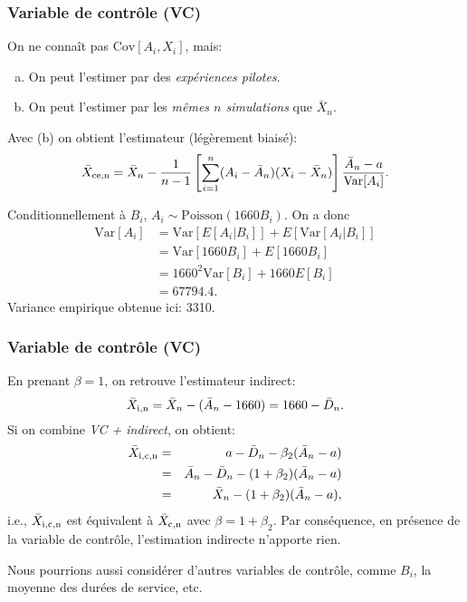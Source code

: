 \documentclass[t,usepdftitle=false]{beamer}
\def\Var{\mbox{Var}}
\def\Cov{\mbox{Cov}}
\begin{document}
\begin{frame}
\frametitle{Variable de contrôle (VC)}

On ne connaît pas $\Cov[A_i, X_i]$, mais:
\begin{enumerate}[(a)]
\item
On peut l'estimer par des \emph{expériences pilotes}.
\item
On peut l'estimer par les \emph{m\^emes $n$ simulations} que $\bar X_n$.
\end{enumerate}

\mbox{}

Avec (b) on obtient l'estimateur (légèrement biaisé):
\[
  \bar X_{\rm{c}e,n} = \bar X_n - {1\over n-1} \left[\sum_{i=1}^n
     (A_i-\bar A_n)(X_i-\bar X_n)\right] {\bar A_n - a\over \Var[A_i]}.
\]

\mbox{}

Conditionnellement \`a $B_i$, $A_i\sim\mbox{Poisson}(1660 B_i)$.  On a donc
\begin{align*}
  {\Var[A_i]} &= \Var[E[A_i|B_i]] + E[\Var[A_i|B_i]] \\
   &= \Var[1660 B_i] + E[1660 B_i] \\
   &= 1660^2 \Var[B_i] + 1660 E[B_i] \\
   &= 67794.4.
\end{align*}
Variance empirique obtenue ici: {3310}.

\end{frame}

\begin{frame}
\frametitle{Variable de contrôle (VC)}

En prenant $\beta=1$, on retrouve l'estimateur indirect:
\[
 \bar X_{\rm{i},n} = \bar X_n - (\bar A_n - 1660) = 1660 - \bar D_n.
\]
Si on combine \emph{VC + indirect}, on obtient:
\begin{eqnarray*}
  {\bar X_{\rm{i},\rm{c},n}} &=& a - \bar D_n - \beta_2 (\bar A_n - a) \\
       &=& \bar A_n - \bar D_n -(1+\beta_2)(\bar A_n - a) \\
       &=& \bar X_n -(1+\beta_2)(\bar A_n - a),
\end{eqnarray*}
i.e., $\bar X_{\rm{i},\rm{c},n}$ est équivalent \`a $\bar X_{\rm{c},n}$ 
avec $\beta = 1+\beta_2$.
Par conséquence, en présence de la variable de contrôle, l'estimation indirecte n'apporte rien.

\mbox{}

Nous pourrions aussi considérer d'autres variables de contrôle, comme $B_i$, la moyenne des durées de service, etc.

\end{frame}
\end{document}
